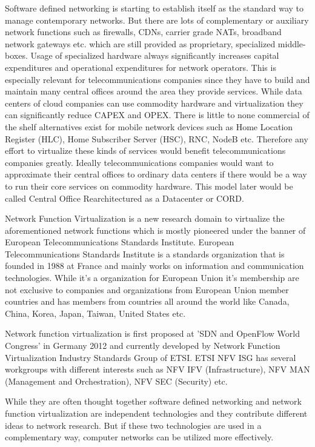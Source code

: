 \documentclass[12pt,oneandhalf,chaparabic,ceng,ms,eng,oneside,pntc]{gsufbe}
\begin{document}
Software defined networking is starting to establish itself as the standard way to manage contemporary
networks. But there are lots of complementary or auxiliary network functions such as firewalls, CDNs,
carrier grade NATs, broadband network gateways etc. which are still provided as proprietary,
specialized middle-boxes. Usage of specialized hardware always significantly increases capital
expenditures and operational expenditures for network operators. This is especially relevant for
telecommunications companies since they have to build and maintain many central offices around
the area they provide services. While data centers of cloud companies can use commodity hardware and
virtualization they can significantly reduce CAPEX and OPEX. There is little to none commercial of the
shelf alternatives exist for mobile network devices such as Home Location Register (HLC), Home
Subscriber Server (HSC), RNC, NodeB etc. Therefore any effort to virtualize these kinds of services
would benefit telecommunications companies greatly. Ideally telecommunications companies would want to
approximate their central offices to ordinary data centers if there would be a way to run their core
services on commodity hardware. This model later would be called Central Office Rearchitectured as a
Datacenter or CORD.

Network Function Virtualization is a new research domain to virtualize the aforementioned network
functions which is mostly pioneered under the banner of European Telecommunications Standards
Institute. European Telecommunications Standards Institute is a standards organization that is
founded in 1988 at France and mainly works on information and communication technologies. While it's a
organization for European Union it's membership are not exclusive to companies and organizations from
European Union member countries and has members from countries all around the world like Canada, China,
Korea, Japan, Taiwan, United States etc.

Network function virtualization is first proposed at 'SDN and OpenFlow World Congress' in
Germany 2012 and currently developed by Network Function Virtualization Industry Standards Group of
ETSI. ETSI NFV ISG has several workgroups with different interests such as NFV IFV (Infrastructure),
NFV MAN (Management and Orchestration), NFV SEC (Security) etc.

While they are often thought together software defined networking and network function virtualization
are independent technologies and they contribute different ideas to network research. But if these two
technologies are used in a complementary way, computer networks can be utilized more effectively.
\end{document}
